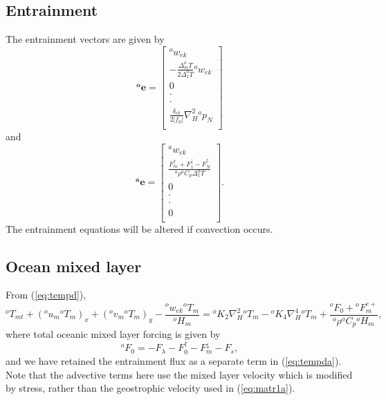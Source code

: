 \documentclass[11pt, a4paper,twoside]{article}
\newcommand{\dt}[2]{\Delta_{#2}^{#1}T}
\newcommand{\rhb}[1]{{{}^{#1}\rho}}
\newcommand{\cp}[1]{{{}^{#1}C_p}}
\newcommand{\p}[2]{{{}^{#1}p_{#2}}}
\newcommand{\uu}[2]{{{}^{#1}u_{#2}}}
\newcommand{\vv}[2]{{{}^{#1}v_{#2}}}
\newcommand{\ek}[1]{{{}^{#1}w_{ek}}}
\newcommand{\HH}[2]{{{}^{#1}H_{#2}}}
\newcommand{\kh}[1]{{{}^{#1}K_2}}
\newcommand{\kf}[1]{{{}^{#1}K_4}}
\newcommand{\T}[2]{{{}^{#1}T_{#2}}}
\newcommand{\F}[3]{{{}^{#1}F^{#3}_{#2}}}
\newcommand{\Fup}[1]{{F^{\uparrow}_{#1}}}
\newcommand{\Fdown}[1]{{F^{\downarrow}_{#1}}}
\newcommand{\vc}[1]{\mathbf{#1}}
\newcommand{\delek}[0]{\delta_{ek}}
\numberwithin{equation}{section}
\begin{document}
\subsection{Entrainment}\label{sub:qglayers}
The entrainment vectors are given by
\begin{equation}
\vc{{}^oe} =
\left[ \begin{array}{c}
\ek{o}\\
- \frac{\dt{o}{m}}{2 \dt{o}{1}} \ek{o}\\
0\\
\cdot\\
\cdot\\
\frac{\delek}{2 \lvert f_0 \rvert }\nabla_H^2\p{o}{N}\\
 \end{array}\right]
\end{equation}
and
\begin{equation}\label{eq:ent1a}
\vc{{}^ae} =
\left[ \begin{array}{c}
\ek{a}\\
\frac{\Fup{m}+ \Fdown{1}   - \Fup{N}  }{\rhb{a} \cp{a} \dt{a}{1} }\\
0\\
\cdot\\
\cdot\\
0\\
 \end{array}\right].
\end{equation}
The entrainment equations will be altered if convection occurs.

\subsection{Ocean mixed layer}
From (\ref{eq:tempd}),
\begin{equation}\label{eq:tempda}
\T{o}{mt} + (\uu{o}{m} \T{o}{m})_x + (\vv{o}{m} \T{o}{m})_y  - \frac{\ek{o} \T{o}{m}}{\HH{o}{m}} =  \kh{o}  \nabla_H^2\T{o}{m} - \kf{o}  \nabla_H^4 \T{o}{m}  + \frac{\F{o}{0}{} +  \F{o}{m}{e+}}{\rhb{o} \cp{o}\HH{o}{m} },
\end{equation}
where total oceanic mixed layer forcing is given by
\begin{equation}
\F{o}{0}{} = - F_{\lambda} - \Fup{0} - \Fdown{m} - F_s,
\end{equation}
and we have retained the entrainment flux as a separate term in (\ref{eq:tempda}).
Note that the advective terms here use the mixed layer velocity which is modified by stress, rather than the geostrophic velocity used in (\ref{eq:matr1a}).
\end{document}
